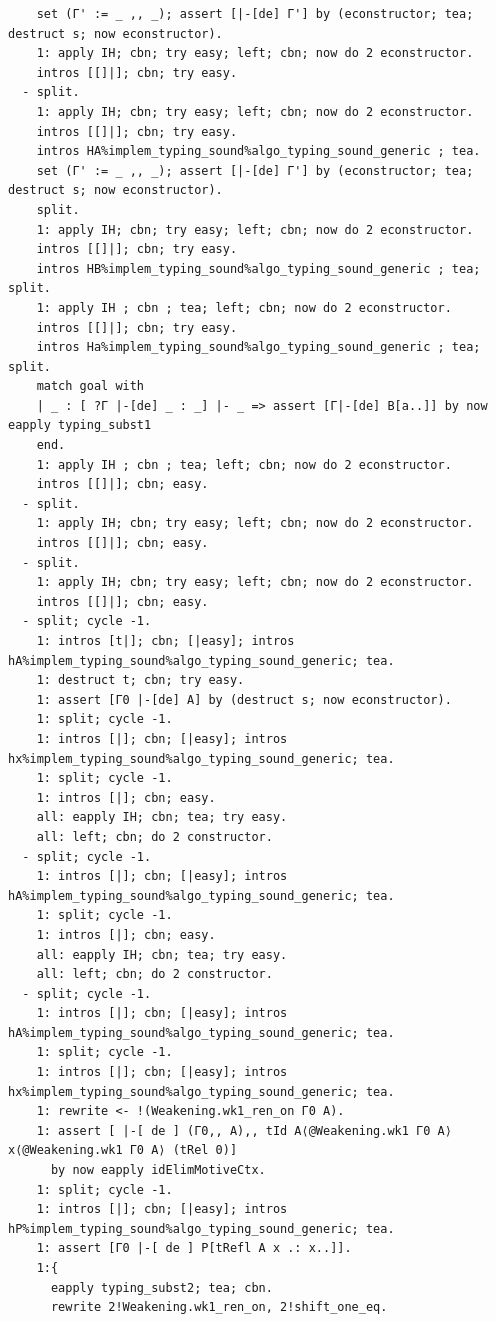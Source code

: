 \documentclass[10pt,a4paper]{amsart}
\begin{document}
\begin{lstlisting}
    set (Γ' := _ ,, _); assert [|-[de] Γ'] by (econstructor; tea; destruct s; now econstructor).
    1: apply IH; cbn; try easy; left; cbn; now do 2 econstructor.
    intros [[]|]; cbn; try easy.
  - split.
    1: apply IH; cbn; try easy; left; cbn; now do 2 econstructor.
    intros [[]|]; cbn; try easy.
    intros HA%implem_typing_sound%algo_typing_sound_generic ; tea.
    set (Γ' := _ ,, _); assert [|-[de] Γ'] by (econstructor; tea; destruct s; now econstructor).
    split.
    1: apply IH; cbn; try easy; left; cbn; now do 2 econstructor.
    intros [[]|]; cbn; try easy.
    intros HB%implem_typing_sound%algo_typing_sound_generic ; tea; split.
    1: apply IH ; cbn ; tea; left; cbn; now do 2 econstructor.
    intros [[]|]; cbn; try easy.
    intros Ha%implem_typing_sound%algo_typing_sound_generic ; tea; split.
    match goal with
    | _ : [ ?Γ |-[de] _ : _] |- _ => assert [Γ|-[de] B[a..]] by now eapply typing_subst1
    end.
    1: apply IH ; cbn ; tea; left; cbn; now do 2 econstructor.
    intros [[]|]; cbn; easy.
  - split.
    1: apply IH; cbn; try easy; left; cbn; now do 2 econstructor.
    intros [[]|]; cbn; easy.
  - split.
    1: apply IH; cbn; try easy; left; cbn; now do 2 econstructor.
    intros [[]|]; cbn; easy.
  - split; cycle -1.
    1: intros [t|]; cbn; [|easy]; intros hA%implem_typing_sound%algo_typing_sound_generic; tea.
    1: destruct t; cbn; try easy.
    1: assert [Γ0 |-[de] A] by (destruct s; now econstructor).
    1: split; cycle -1.
    1: intros [|]; cbn; [|easy]; intros hx%implem_typing_sound%algo_typing_sound_generic; tea.
    1: split; cycle -1.
    1: intros [|]; cbn; easy.
    all: eapply IH; cbn; tea; try easy.
    all: left; cbn; do 2 constructor.
  - split; cycle -1.
    1: intros [|]; cbn; [|easy]; intros hA%implem_typing_sound%algo_typing_sound_generic; tea.
    1: split; cycle -1.
    1: intros [|]; cbn; easy.
    all: eapply IH; cbn; tea; try easy.
    all: left; cbn; do 2 constructor.
  - split; cycle -1.
    1: intros [|]; cbn; [|easy]; intros hA%implem_typing_sound%algo_typing_sound_generic; tea.
    1: split; cycle -1.
    1: intros [|]; cbn; [|easy]; intros hx%implem_typing_sound%algo_typing_sound_generic; tea.
    1: rewrite <- !(Weakening.wk1_ren_on Γ0 A).
    1: assert [ |-[ de ] (Γ0,, A),, tId A⟨@Weakening.wk1 Γ0 A⟩ x⟨@Weakening.wk1 Γ0 A⟩ (tRel 0)]
      by now eapply idElimMotiveCtx.
    1: split; cycle -1.
    1: intros [|]; cbn; [|easy]; intros hP%implem_typing_sound%algo_typing_sound_generic; tea.
    1: assert [Γ0 |-[ de ] P[tRefl A x .: x..]].
    1:{ 
      eapply typing_subst2; tea; cbn.
      rewrite 2!Weakening.wk1_ren_on, 2!shift_one_eq.

\end{lstlisting}
\end{document}
